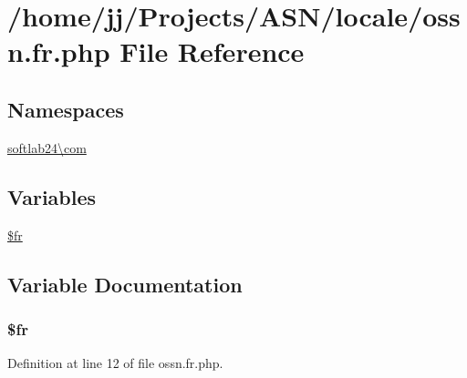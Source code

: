 \hypertarget{locale_2ossn_8fr_8php}{}\section{/home/jj/\+Projects/\+A\+S\+N/locale/ossn.fr.\+php File Reference}
\label{locale_2ossn_8fr_8php}
\subsection*{Namespaces}
\begin{DoxyCompactItemize}
\item 
 \hyperlink{namespacesoftlab24_1_1com}{softlab24\textbackslash{}com}
\end{DoxyCompactItemize}
\subsection*{Variables}
\begin{DoxyCompactItemize}
\item 
\hyperlink{locale_2ossn_8fr_8php_ad5107c697816e7b7f89ad1b3e94e3e0e}{\$fr}
\end{DoxyCompactItemize}


\subsection{Variable Documentation}
\subsubsection[{\texorpdfstring{\$fr}{$fr}}]{\setlength{\rightskip}{0pt plus 5cm}\$fr}\hypertarget{locale_2ossn_8fr_8php_ad5107c697816e7b7f89ad1b3e94e3e0e}{}\label{locale_2ossn_8fr_8php_ad5107c697816e7b7f89ad1b3e94e3e0e}


Definition at line 12 of file ossn.\+fr.\+php.

